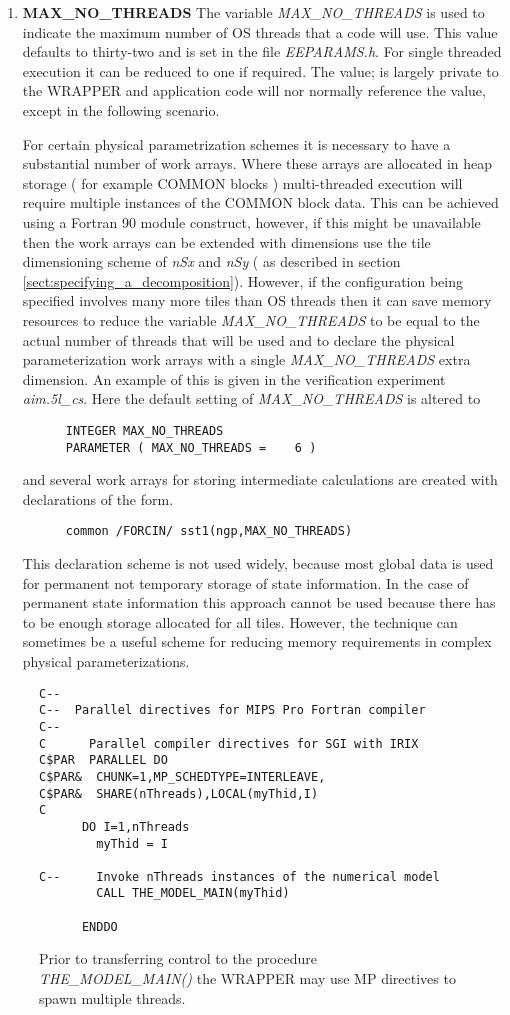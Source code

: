 \begin{enumerate}
\item {\bf MAX\_NO\_THREADS}
The variable {\em MAX\_NO\_THREADS} is used to indicate the
maximum number of OS threads that a code will use. This
value defaults to thirty-two and is set in the file {\em EEPARAMS.h}.
For single threaded execution it can be reduced to one if required.
The value; is largely private to the WRAPPER and application code
will nor normally reference the value, except in the following scenario.

For certain physical parametrization schemes it is necessary to have 
a substantial number of work arrays. Where these arrays are allocated
in heap storage ( for example COMMON blocks ) multi-threaded
execution will require multiple instances of the COMMON block data.
This can be achieved using a Fortran 90 module construct, however,
if this might be unavailable then the work arrays can be extended
with dimensions use the tile dimensioning scheme of {\em nSx}
and {\em nSy} ( as described in section 
\ref{sect:specifying_a_decomposition}). However, if the configuration
being specified involves many more tiles than OS threads then
it can save memory resources to reduce the variable
{\em MAX\_NO\_THREADS} to be equal to the actual number of threads that
will be used and to declare the physical parameterization
work arrays with a single {\em MAX\_NO\_THREADS} extra dimension.
An example of this is given in the verification experiment
{\em aim.5l\_cs}. Here the default setting of 
{\em MAX\_NO\_THREADS} is altered to
\begin{verbatim}
      INTEGER MAX_NO_THREADS
      PARAMETER ( MAX_NO_THREADS =    6 )
\end{verbatim}
and several work arrays for storing intermediate calculations are
created with declarations of the form.
\begin{verbatim}
      common /FORCIN/ sst1(ngp,MAX_NO_THREADS)
\end{verbatim}
This declaration scheme is not used widely, because most global data
is used for permanent not temporary storage of state information.
In the case of permanent state information this approach cannot be used
because there has to be enough storage allocated for all tiles.
However, the technique can sometimes be a useful scheme for reducing memory 
requirements in complex physical parameterizations.
\end{enumerate}

\begin{figure}
\begin{verbatim}
C--
C--  Parallel directives for MIPS Pro Fortran compiler
C--
C      Parallel compiler directives for SGI with IRIX
C$PAR  PARALLEL DO
C$PAR&  CHUNK=1,MP_SCHEDTYPE=INTERLEAVE,
C$PAR&  SHARE(nThreads),LOCAL(myThid,I)
C
      DO I=1,nThreads
        myThid = I

C--     Invoke nThreads instances of the numerical model
        CALL THE_MODEL_MAIN(myThid)

      ENDDO
\end{verbatim}
\caption{Prior to transferring control to
the procedure {\em THE\_MODEL\_MAIN()} the WRAPPER may use
MP directives to spawn multiple threads.
} \label{fig:mp_directives}
\end{figure}


